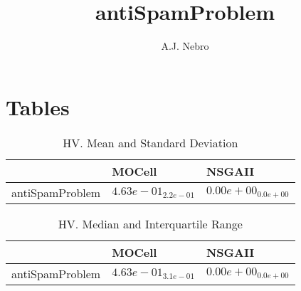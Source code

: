 \documentclass{article}
\title{antiSpamProblem}
\author{A.J. Nebro}
\begin{document}
\maketitle
\section{Tables}

\begin{table}
\caption{HV. Mean and Standard Deviation}
\label{table: HV}
\centering
\begin{scriptsize}
\begin{tabular}{lll}
\hline & MOCell &  NSGAII\\
\hline 
antiSpamProblem & \cellcolor{gray95}$  4.63e-01_{ 2.2e-01}$ & $  0.00e+00_{ 0.0e+00}$ \\
\hline
\end{tabular}
\end{scriptsize}
\end{table}

\begin{table}
\caption{HV. Median and Interquartile Range}
\label{table: HV}
\centering
\begin{scriptsize}
\begin{tabular}{lll}
\hline & MOCell &  NSGAII\\
\hline 
antiSpamProblem & \cellcolor{gray95}$  4.63e-01_{ 3.1e-01}$ & $  0.00e+00_{ 0.0e+00}$ \\
\hline
\end{tabular}
\end{scriptsize}
\end{table}
\end{document}
